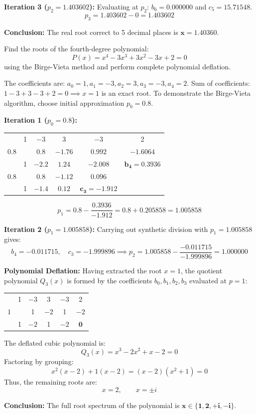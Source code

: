 \documentclass[11pt,a4paper]{article}
\begin{document}
\begin{solbox}
\textbf{Iteration 3 ($p_2 = 1.403602$):}
Evaluating at $p_2$: $b_6 = 0.000000$ and $c_5 = 15.71548$.
$$p_3 = 1.403602 - 0 = \mathbf{1.403602}$$

\textbf{Conclusion:} The real root correct to 5 decimal places is $\mathbf{x = 1.40360}$.
\end{solbox}

\begin{exambox}
Find the roots of the fourth-degree polynomial:
$$P(x) = x^4 - 3x^3 + 3x^2 - 3x + 2 = 0$$
using the Birge-Vieta method and perform complete polynomial deflation.
\end{exambox}

\begin{solbox}
The coefficients are: $a_0 = 1, a_1 = -3, a_2 = 3, a_3 = -3, a_4 = 2$.
Sum of coefficients: $1 - 3 + 3 - 3 + 2 = 0 \implies x = 1$ is an exact root.
To demonstrate the Birge-Vieta algorithm, choose initial approximation $p_0 = 0.8$.

\textbf{Iteration 1 ($p_0 = 0.8$):}
\begin{center}
\begin{tabular}{c|ccccc}
    & 1 & $-3$ & 3 & $-3$ & 2 \\
    $0.8$ & & $0.8$ & $-1.76$ & $0.992$ & $-1.6064$ \\
    \hline
    & 1 & $-2.2$ & $1.24$ & $-2.008$ & $\mathbf{b_4 = 0.3936}$ \\
    $0.8$ & & $0.8$ & $-1.12$ & $0.096$ & \\
    \hline
    & 1 & $-1.4$ & $0.12$ & $\mathbf{c_3 = -1.912}$ &
\end{tabular}
\end{center}
$$p_1 = 0.8 - \frac{0.3936}{-1.912} = 0.8 + 0.205858 = \mathbf{1.005858}$$

\textbf{Iteration 2 ($p_1 = 1.005858$):}
Carrying out synthetic division with $p_1 = 1.005858$ gives:
$$b_4 = -0.011715, \quad c_3 = -1.999896 \implies p_2 = 1.005858 - \frac{-0.011715}{-1.999896} = \mathbf{1.000000}$$

\textbf{Polynomial Deflation:}
Having extracted the root $x = 1$, the quotient polynomial $Q_3(x)$ is formed by the coefficients $b_0, b_1, b_2, b_3$ evaluated at $p = 1$:
\begin{center}
\begin{tabular}{c|ccccc}
    & 1 & $-3$ & 3 & $-3$ & 2 \\
    $1$ & & 1 & $-2$ & 1 & $-2$ \\
    \hline
    & 1 & $-2$ & 1 & $-2$ & $\mathbf{0}$
\end{tabular}
\end{center}
The deflated cubic polynomial is:
$$Q_3(x) = x^3 - 2x^2 + x - 2 = 0$$
Factoring by grouping:
$$x^2(x - 2) + 1(x - 2) = (x - 2)(x^2 + 1) = 0$$
Thus, the remaining roots are:
$$x = 2, \qquad x = \pm i$$

\textbf{Conclusion:} The full root spectrum of the polynomial is $\mathbf{x \in \{1, 2, +i, -i\}}$.
\end{solbox}
\end{document}
